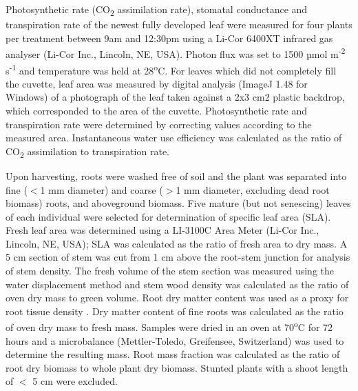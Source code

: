 \documentclass[openright,12pt,a4paper]{memoir}
\begin{document}
Photosynthetic rate (CO\textsubscript{2} assimilation rate), stomatal conductance and transpiration rate of the newest fully developed leaf were measured for four plants per treatment between 9am and 12:30pm using a Li-Cor 6400XT infrared gas analyser (Li-Cor Inc., Lincoln, NE, USA). Photon flux was set to 1500 µmol m\textsuperscript{-2} s\textsuperscript{-1} and temperature was held at 28\textsuperscript{o}C. For leaves which did not completely fill the cuvette, leaf area was measured by digital analysis (ImageJ 1.48 for Windows) of a photograph of the leaf taken against a 2x3 cm2 plastic backdrop, which corresponded to the area of the cuvette. Photosynthetic rate and transpiration rate were determined by correcting values according to the measured area. Instantaneous water use efficiency was calculated as the ratio of CO\textsubscript{2} assimilation to transpiration rate.

Upon harvesting, roots were washed free of soil and the plant was separated into fine ($<$1 mm diameter) and coarse ($>$1 mm diameter, excluding dead root biomass) roots, and aboveground biomass. Five mature (but not senescing) leaves of each individual were selected for determination of specific leaf area (SLA). Fresh leaf area was determined using a LI-3100C Area Meter (Li-Cor Inc., Lincoln, NE, USA); SLA was calculated as the ratio of fresh area to dry mass.  A 5 cm section of stem was cut from 1 cm above the root-stem junction for analysis of stem density. The fresh volume of the stem section was measured using the water displacement method and stem wood density was calculated as the ratio of oven dry mass to green volume. Root dry matter content was used as a proxy for root tissue density \citep{Birouste2013}. Dry matter content of fine roots was calculated as the ratio of oven dry mass to fresh mass. Samples were dried in an oven at 70\textsuperscript{o}C for 72 hours and a microbalance (Mettler-Toledo, Greifensee, Switzerland) was used to determine the resulting mass. Root mass fraction was calculated as the ratio of root dry biomass to whole plant dry biomass. Stunted plants with a shoot length of $<$ 5 cm were excluded.
\end{document}
